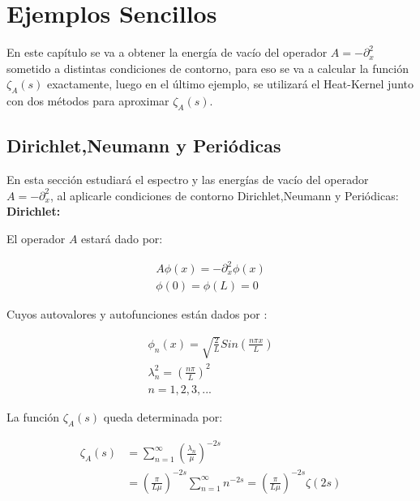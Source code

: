 \chapter{Ejemplos Sencillos}

  
En este capítulo se va a obtener la energía de vacío del operador $A = - \partial ^2 _x$ sometido a distintas condiciones de contorno, para eso se va a calcular la función $ \zeta _A (s) $ exactamente, luego en el último ejemplo, se utilizará el Heat-Kernel junto con dos métodos para aproximar $\zeta _A (s)$.

\section{Dirichlet,Neumann y Periódicas}

En esta sección estudiará el espectro y las energías de vacío del operador $A = - \partial ^2 _x$, al aplicarle condiciones de contorno Dirichlet,Neumann y Periódicas: \\

\textbf{Dirichlet:}

El operador $A$ estará dado por:

\begin{equation}
\begin{array}{c}
	A \phi (x) = - \partial _x ^2 \phi (x) \\[10pt]
    \phi (0) = \phi(L) = 0 
\end{array}
\end{equation}


Cuyos autovalores y autofunciones están dados por  : 

\begin{equation}
\begin{array}{c}
	\phi _n (x) = \sqrt{\frac{2}{L}} Sin( \frac{n \pi x}{L} ) \\[10pt]
	\lambda _n ^2 = \left( \frac{n \pi }{L} \right) ^2 \\[10pt]
	n = 1,2,3, ...
\end{array}
\end{equation}

La función $\zeta _A (s)$ queda determinada por:

\begin{equation}
\begin{aligned}
\zeta _A (s) &= 
\sum _{n=1} ^{\infty} \left( \frac{\lambda _n}{\mu} \right) ^{-2s}  \\[10pt]
&= \left(  \frac{\pi}{L \mu} \right) ^{-2s}   \sum _{n=1} ^{\infty} n ^{-2s} = 
\left( \frac{\pi}{L \mu} \right) ^{-2s}  \zeta (2s) \\[10pt]
\end{aligned}
\end{equation}


